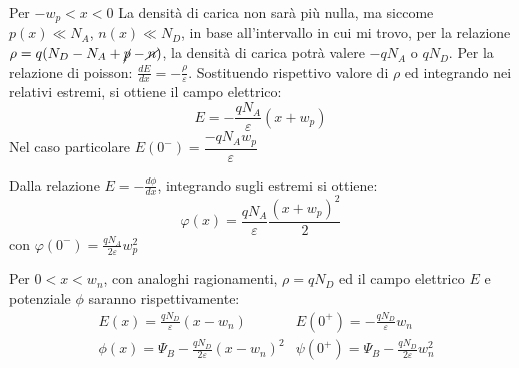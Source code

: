 \documentclass[../template]{subfiles}
\begin{document}
\begin{tcolorbox}[title={Regione svuotata e regione di carica}]
    Per $-w_p < x < 0$
    La densità di carica non sarà più nulla, ma siccome $p(x) \ll N_A$, $n(x) \ll N_D$, in base all'intervallo in cui mi trovo, per la relazione $\rho = q(N_D - N_A + \cancel{p} - \cancel{n})$, la densità di carica potrà valere $-qN_A$ o $qN_D$.
    Per la relazione di poisson: $\frac{dE}{dx} = -\frac{\rho}{\varepsilon}$. Sostituendo rispettivo valore di $\rho$ ed integrando nei relativi estremi, si ottiene il campo elettrico:
    \[
        E = - \frac{qN_A}{\varepsilon} (x + w_p)
    \]
    Nel caso particolare $E(0^-) = \dfrac{-qN_A w_p}{\varepsilon}$

    Dalla relazione $E = -\frac{d\phi}{dx}$, integrando sugli estremi si ottiene:
    \[
        \varphi(x) = \frac{qN_A}{\varepsilon}\frac{{(x + w_p)}^2}{2}
    \]
    con $\varphi(0^-) = \frac{qN_A}{2\varepsilon}w^2_p$
\end{tcolorbox}
\begin{tcolorbox}[title={}]
    Per $0 < x < w_n$, con analoghi ragionamenti, $\rho = qN_D$
    ed il campo elettrico $E$ e potenziale $\phi$ saranno rispettivamente:
    \begin{align*}
        &E(x) = \frac{qN_D}{\varepsilon} (x - w_n) & E(0^+) = - \frac{qN_D}{\varepsilon} w_n\\
        &\phi(x) = \Psi_B - \frac{qN_D}{2\varepsilon} {(x - w_n)}^2 & \psi(0^+) = \Psi_B - \frac{qN_D}{2\varepsilon} w_n^2
    \end{align*}
\end{tcolorbox}
\end{document}
